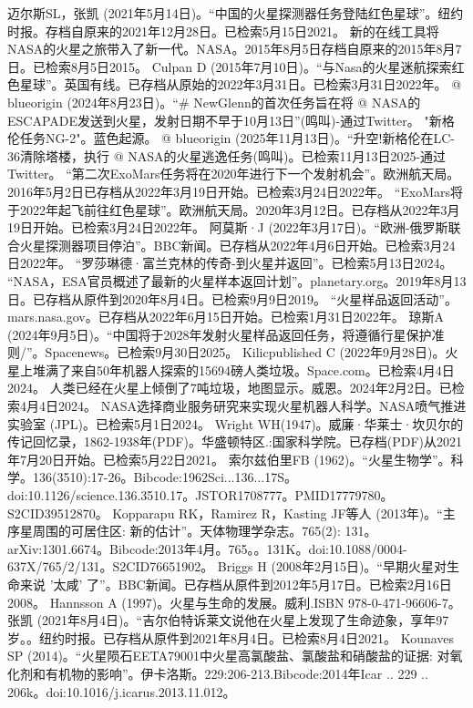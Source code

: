 \begin{enumerate}
 迈尔斯SL，张凯 (2021年5月14日)。“中国的火星探测器任务登陆红色星球”。纽约时报。存档自原来的2021年12月28日。已检索5月15日2021。
 新的在线工具将NASA的火星之旅带入了新一代。NASA。2015年8月5日存档自原来的2015年8月7日。已检索8月5日2015。
 Culpan D (2015年7月10日)。“与Nasa的火星迷航探索红色星球”。英国有线。已存档从原始的2022年3月31日。已检索3月31日2022年。
 @ blueorigin (2024年8月23日)。“# NewGlenn的首次任务旨在将 @ NASA的ESCAPADE发送到火星，发射日期不早于10月13日”(鸣叫)-通过Twitter。
 "新格伦任务NG-2"。蓝色起源。
 @ blueorigin (2025年11月13日)。“升空!新格伦在LC-36清除塔楼，执行 @ NASA的火星逃逸任务(鸣叫)。已检索11月13日2025-通过Twitter。
 “第二次ExoMars任务将在2020年进行下一个发射机会”。欧洲航天局。2016年5月2日已存档从2022年3月19日开始。已检索3月24日2022年。
 “ExoMars将于2022年起飞前往红色星球”。欧洲航天局。2020年3月12日。已存档从2022年3月19日开始。已检索3月24日2022年。
 阿莫斯·J (2022年3月17日)。“欧洲-俄罗斯联合火星探测器项目停泊”。BBC新闻。已存档从2022年4月6日开始。已检索3月24日2022年。
 “罗莎琳德·富兰克林的传奇-到火星并返回”。已检索5月13日2024。
 “NASA，ESA官员概述了最新的火星样本返回计划”。planetary.org。2019年8月13日。已存档从原件到2020年8月4日。已检索9月9日2019。
 “火星样品返回活动”。mars.nasa.gov。已存档从2022年6月15日开始。已检索1月31日2022年。
 琼斯A (2024年9月5日)。“中国将于2028年发射火星样品返回任务，将遵循行星保护准则/”。Spacenews。已检索9月30日2025。
 Kilicpublished C (2022年9月28日)。火星上堆满了来自50年机器人探索的15694磅人类垃圾。Space.com。已检索4月4日2024。
 人类已经在火星上倾倒了7吨垃圾，地图显示。威恩。2024年2月2日。已检索4月4日2024。
 NASA选择商业服务研究来实现火星机器人科学。NASA喷气推进实验室 (JPL)。已检索5月1日2024。
 Wright WH(1947)。威廉·华莱士·坎贝尔的传记回忆录，1862-1938年(PDF)。华盛顿特区.:国家科学院。已存档(PDF)从2021年7月20日开始。已检索5月22日2021。
 索尔兹伯里FB (1962)。“火星生物学”。科学。136(3510):17-26。Bibcode:1962Sci...136...17S。doi:10.1126/science.136.3510.17。JSTOR1708777。PMID17779780。S2CID39512870。   
 Kopparapu RK，Ramirez R，Kasting JF等人 (2013年)。“主序星周围的可居住区: 新的估计”。天体物理学杂志。765(2): 131。arXiv:1301.6674。Bibcode:2013年4月。765。。131K。doi:10.1088/0004-637X/765/2/131。S2CID76651902。 
 Briggs H (2008年2月15日)。“早期火星对生命来说 '太咸' 了”。BBC新闻。已存档从原件到2012年5月17日。已检索2月16日2008。
 Hannsson A (1997)。火星与生命的发展。威利.ISBN 978-0-471-96606-7。
 张凯 (2021年8月4日)。“吉尔伯特诉莱文说他在火星上发现了生命迹象，享年97岁。。纽约时报。已存档从原件到2021年8月4日。已检索8月4日2021。
 Kounaves SP (2014)。“火星陨石EETA79001中火星高氯酸盐、氯酸盐和硝酸盐的证据: 对氧化剂和有机物的影响”。伊卡洛斯。229:206-213.Bibcode:2014年Icar .. 229 .. 206k。doi:10.1016/j.icarus.2013.11.012。

\end{enumerate}
